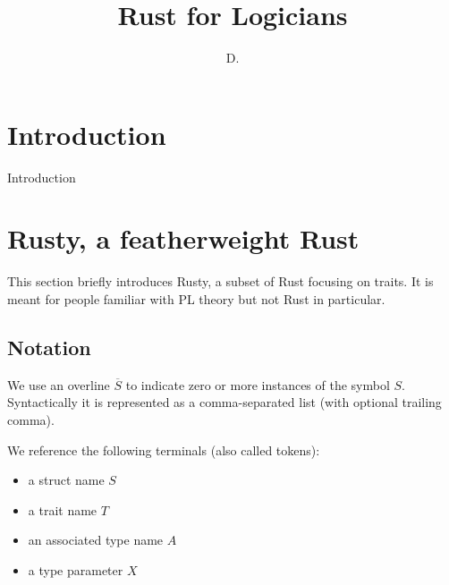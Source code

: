 \documentclass[sn-mathphys-num]{sn-jnl}%
\theoremstyle{thmstyleone}%
\theoremstyle{thmstyletwo}%
\theoremstyle{thmstylethree}%
\begin{document}
\title[Rust for Logicians]{Rust for Logicians}


\author{ D. }




\maketitle

\section{Introduction}\label{sec1}

Introduction

\section{Rusty, a featherweight Rust}

This section briefly introduces Rusty, a subset of Rust focusing on traits.
It is meant for people familiar with PL theory but not Rust in particular.

\subsection{Notation}

We use an overline $\overline{S}$ to indicate zero or more instances of the symbol $S$.
Syntactically it is represented as a comma-separated list (with optional trailing comma).

We reference the following terminals (also called tokens):

\begin{itemize}
    \item a struct name $S$
    \item a trait name $T$
    \item an associated type name $A$
    \item a type parameter $X$
\end{itemize}
\end{document}
